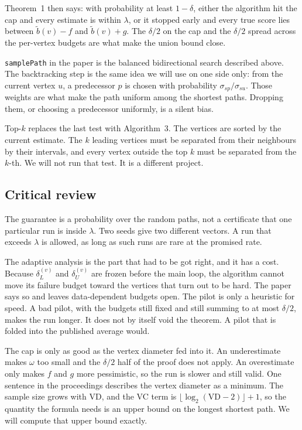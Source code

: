 \documentclass[11pt]{article}
\begin{document}
Theorem~1 then says: with probability at least $1-\delta$, either the algorithm hit the cap and every estimate is within $\lambda$, or it stopped early and every true score lies between $\tilde b(v)-f$ and $\tilde b(v)+g$. The $\delta/2$ on the cap and the $\delta/2$ spread across the per-vertex budgets are what make the union bound close.

\texttt{samplePath} in the paper is the balanced bidirectional search described above. The backtracking step is the same idea we will use on one side only: from the current vertex $u$, a predecessor $p$ is chosen with probability $\sigma_{sp}/\sigma_{su}$. Those weights are what make the path uniform among the shortest paths. Dropping them, or choosing a predecessor uniformly, is a silent bias.

Top-$k$ replaces the last test with Algorithm~3. The vertices are sorted by the current estimate. The $k$ leading vertices must be separated from their neighbours by their intervals, and every vertex outside the top $k$ must be separated from the $k$-th. We will not run that test. It is a different project.

\subsection{Critical review}

The guarantee is a probability over the random paths, not a certificate that one particular run is inside $\lambda$. Two seeds give two different vectors. A run that exceeds $\lambda$ is allowed, as long as such runs are rare at the promised rate.

The adaptive analysis is the part that had to be got right, and it has a cost. Because $\delta_L^{(v)}$ and $\delta_U^{(v)}$ are frozen before the main loop, the algorithm cannot move its failure budget toward the vertices that turn out to be hard. The paper says so and leaves data-dependent budgets open. The pilot is only a heuristic for speed. A bad pilot, with the budgets still fixed and still summing to at most $\delta/2$, makes the run longer. It does not by itself void the theorem. A pilot that is folded into the published average would.

The cap is only as good as the vertex diameter fed into it. An underestimate makes $\omega$ too small and the $\delta/2$ half of the proof does not apply. An overestimate only makes $f$ and $g$ more pessimistic, so the run is slower and still valid. One sentence in the proceedings describes the vertex diameter as a minimum. The sample size grows with $\mathrm{VD}$, and the VC term is $\lfloor\log_2(\mathrm{VD}-2)\rfloor+1$, so the quantity the formula needs is an upper bound on the longest shortest path. We will compute that upper bound exactly.
\end{document}
